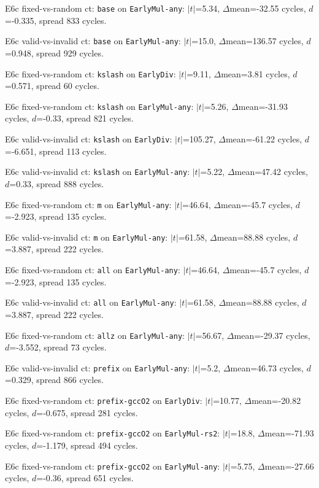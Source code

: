 \item E6c fixed-vs-random ct: \texttt{base} on \texttt{EarlyMul-any}: $|t|$=5.34, $\Delta$mean=-32.55 cycles, $d$=-0.335, spread 833 cycles.
\item E6c valid-vs-invalid ct: \texttt{base} on \texttt{EarlyMul-any}: $|t|$=15.0, $\Delta$mean=136.57 cycles, $d$=0.948, spread 929 cycles.
\item E6c fixed-vs-random ct: \texttt{kslash} on \texttt{EarlyDiv}: $|t|$=9.11, $\Delta$mean=3.81 cycles, $d$=0.571, spread 60 cycles.
\item E6c fixed-vs-random ct: \texttt{kslash} on \texttt{EarlyMul-any}: $|t|$=5.26, $\Delta$mean=-31.93 cycles, $d$=-0.33, spread 821 cycles.
\item E6c valid-vs-invalid ct: \texttt{kslash} on \texttt{EarlyDiv}: $|t|$=105.27, $\Delta$mean=-61.22 cycles, $d$=-6.651, spread 113 cycles.
\item E6c valid-vs-invalid ct: \texttt{kslash} on \texttt{EarlyMul-any}: $|t|$=5.22, $\Delta$mean=47.42 cycles, $d$=0.33, spread 888 cycles.
\item E6c fixed-vs-random ct: \texttt{m} on \texttt{EarlyMul-any}: $|t|$=46.64, $\Delta$mean=-45.7 cycles, $d$=-2.923, spread 135 cycles.
\item E6c valid-vs-invalid ct: \texttt{m} on \texttt{EarlyMul-any}: $|t|$=61.58, $\Delta$mean=88.88 cycles, $d$=3.887, spread 222 cycles.
\item E6c fixed-vs-random ct: \texttt{all} on \texttt{EarlyMul-any}: $|t|$=46.64, $\Delta$mean=-45.7 cycles, $d$=-2.923, spread 135 cycles.
\item E6c valid-vs-invalid ct: \texttt{all} on \texttt{EarlyMul-any}: $|t|$=61.58, $\Delta$mean=88.88 cycles, $d$=3.887, spread 222 cycles.
\item E6c fixed-vs-random ct: \texttt{allz} on \texttt{EarlyMul-any}: $|t|$=56.67, $\Delta$mean=-29.37 cycles, $d$=-3.552, spread 73 cycles.
\item E6c valid-vs-invalid ct: \texttt{prefix} on \texttt{EarlyMul-any}: $|t|$=5.2, $\Delta$mean=46.73 cycles, $d$=0.329, spread 866 cycles.
\item E6c fixed-vs-random ct: \texttt{prefix-gccO2} on \texttt{EarlyDiv}: $|t|$=10.77, $\Delta$mean=-20.82 cycles, $d$=-0.675, spread 281 cycles.
\item E6c fixed-vs-random ct: \texttt{prefix-gccO2} on \texttt{EarlyMul-rs2}: $|t|$=18.8, $\Delta$mean=-71.93 cycles, $d$=-1.179, spread 494 cycles.
\item E6c fixed-vs-random ct: \texttt{prefix-gccO2} on \texttt{EarlyMul-any}: $|t|$=5.75, $\Delta$mean=-27.66 cycles, $d$=-0.36, spread 651 cycles.
